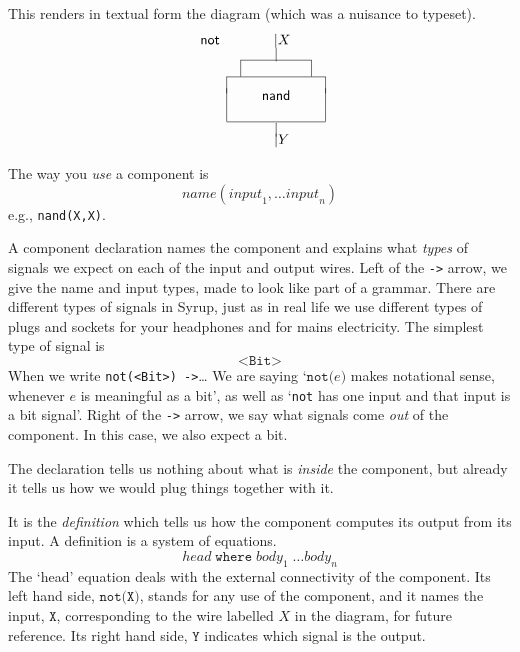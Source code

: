 \documentclass{article}
\newcommand{\C}{\mathsf}
\begin{document}
This renders in textual form the diagram (which was a nuisance to typeset).
\[\begin{array}{lccccc}
    \C{not} && & \hspace*{0.12in}|X & & \vspace*{-0.03in}\\
               && & | & & \vspace*{-0.03in}\\
    \cline{3-5}
       &        & \multicolumn{3}{|c|}{} & \\
    \cline{2-6}
    &\multicolumn{5}{|c|}{} \vspace*{-0.05in}\\
    &\multicolumn{5}{|c|}{\mathsf{nand}}  \\
    &\multicolumn{5}{|c|}{}\\
    \cline{2-6}
    \vspace*{-0.03in}
    &&& | && \vspace*{-0.03in}\\
    &&&\hspace*{0.11in} |Y && \\
\end{array}  \]

The way you \emph{use} a component is
\[
  \mathit{name}(\mathit{input}_1,\ldots \mathit{input}_n)
\]
e.g., \texttt{nand(X,X)}.

A component declaration names the component and
explains what \emph{types} of signals we expect
on each of the input and output wires.
Left of the \texttt{->} arrow, we give the name and
input types, made to look like part of a grammar.
There are
different types of signals in Syrup, just as in real life
we use different types of plugs and sockets for your headphones
and for mains electricity. The simplest type of signal is
\[
  \texttt{<Bit>}
\]
When we write \texttt{not(<Bit>) ->}\ldots
We are saying `$\texttt{not(}e\texttt{)}$ makes notational sense,
whenever $e$ is meaningful as a bit', as well as
`\texttt{not} has one input and that input is a bit signal'.
Right of the \texttt{->} arrow, we say what signals come \emph{out}
of the component. In this case, we also expect a bit.

The declaration tells us nothing about what is \emph{inside} the
component, but already it tells us how we would plug things together
with it.

It is the \emph{definition} which tells us how the component computes
its output from its input. A definition is a system of equations.
\[
  \mathit{head}\;\texttt{where}\; \mathit{body}_1\;\ldots \mathit{body}_n
\]
The `head' equation deals with the external connectivity of the
component. Its left hand side, $\texttt{not(X)}$, stands for any use
of the component, and it names the input, $\texttt{X}$, corresponding
to the wire labelled $X$ in the diagram, for future reference. Its
right hand side, $\texttt{Y}$ indicates which signal is the output.
\end{document}
